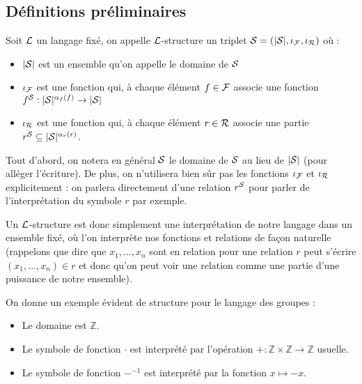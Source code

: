 \subsection{Définitions préliminaires}

\begin{defi}[$\LL$-structure]
    Soit $\LL$ un langage fixé, on appelle $\LL$-structure un triplet $\mathcal S=(|\mathcal S|,\iota_\mathcal F,\iota_\mathcal R)$ où :
    \begin{itemize}[label=$\bullet$]
        \item $|\mathcal S|$ est un ensemble qu'on appelle le domaine de $\mathcal S$
        \item $\iota_\mathcal F$ est une fonction qui, à chaque élément $f\in\mathcal F$ associe une fonction $f^\mathcal S : |\mathcal S|^{\alpha_f(f)}\to|\mathcal S|$
        \item $\iota_\mathcal R$ est une fonction qui, à chaque élément $r\in\mathcal R$ associe une partie $r^\mathcal S \subseteq |\mathcal S|^{\alpha_r(r)}$.
    \end{itemize}
\end{defi}

\begin{rmk}
    Tout d'abord, on notera en général $\mathcal S$ le domaine de $\mathcal S$ au lieu de $|\mathcal S|$ (pour alléger l'écriture). De plus, on n'utilisera bien sûr pas les fonctions $\iota_\mathcal F$ et $\iota_\mathcal R$ explicitement : on parlera directement d'une relation $r^\mathcal S$ pour parler de l'interprétation du symbole $r$ par exemple.
\end{rmk}

Un $\LL$-structure est donc simplement une interprétation de notre langage dans un ensemble fixé, où l'on interprète nos fonctions et relations de façon naturelle (rappelons que dire que $x_1,\ldots,x_n$ sont en relation pour une relation $r$ peut s'écrire $(x_1,\ldots,x_n)\in r$ et donc qu'on peut voir une relation comme une partie d'une puissance de notre ensemble).

\begin{expl}\label{expl:grp}
    On donne un exemple évident de structure pour le langage des groupes :
    \begin{itemize}[label=$\bullet$]
        \item Le domaine est $\mathbb Z$.
        \item Le symbole de fonction $\cdot$ est interprété par l'opération $+ : \mathbb Z \times \mathbb Z \to \mathbb Z$ usuelle.
        \item Le symbole de fonction $-^{-1}$ est interprété par la fonction $x\mapsto -x$.
    \end{itemize}
\end{expl}

